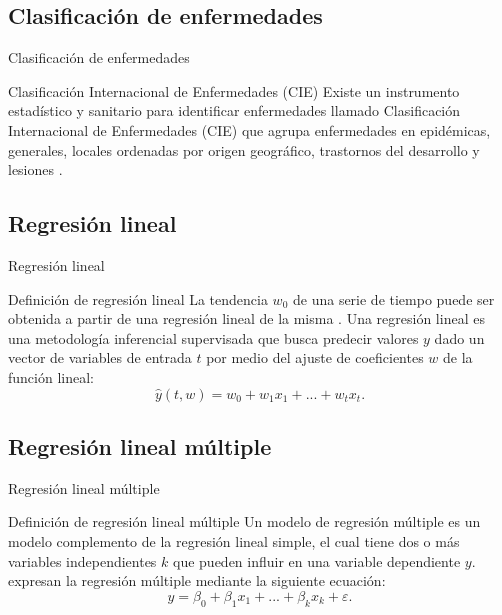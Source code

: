 \documentclass[11pt]{beamer}
\begin{document}
\subsection{Clasificación de enfermedades}
\begin{frame}{Clasificación de enfermedades}
\begin{block}{Clasificación Internacional de Enfermedades (CIE)} \justifying
Existe un instrumento estadístico y sanitario para identificar enfermedades llamado Clasificación Internacional de Enfermedades (CIE) que agrupa enfermedades en epidémicas, generales, locales ordenadas por origen geográfico, trastornos del desarrollo y lesiones \citep{r9}.
\end{block}
\end{frame}
\subsection{Regresión lineal}
\begin{frame}{Regresión lineal}
\begin{block}{Definición de regresión lineal} \justifying
La tendencia $w_0$ de una serie de tiempo puede ser obtenida a partir de una regresión lineal de la misma \citep{r10}. Una regresión lineal es una metodología inferencial supervisada que busca predecir valores $y$ dado un vector de variables de entrada $t$ por medio del ajuste de coeficientes $w$ de la función lineal: 
\begin{equation}
    \hat{y}(t,w) = w_0 + w_1x_1 + ... + w_tx_t.
    \label{eq1}
\end{equation}
\end{block}
\end{frame}
\subsection{Regresión lineal múltiple}
\begin{frame}{Regresión lineal múltiple}
\begin{block}{Definición de regresión lineal múltiple} \justifying
Un modelo de regresión múltiple es un modelo complemento de la regresión lineal simple, el cual tiene dos o más variables independientes $k$ que pueden influir en una variable dependiente $y$. \citet{r11} expresan la regresión múltiple mediante la siguiente ecuación:
\begin{equation}
    y = \beta_0 + \beta_1x_1 + ... + \beta_kx_k + \varepsilon.
    \label{eq2}
\end{equation}
\end{block}
\end{frame}
\end{document}
